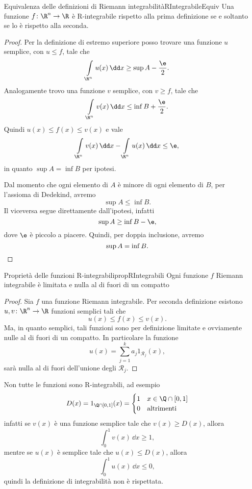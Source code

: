 \begin{teor}{Equivalenza delle definizioni di Riemann integrabilità}{RIntegrabileEquiv}
	Una funzione \(f\colon\R^n\to\R\) è R-integrabile rispetto alla prima definizione se e soltanto se lo è rispetto alla seconda.
\end{teor}

\begin{proof}
	\graffito{\(\Rightarrow)\)}Per la definizione di estremo superiore posso trovare una funzione \(u\) semplice, con \(u\le f\), tale che
	\[
		\int\limits_{\R^n}u(x)\,\dd x\ge\sup A- \frac{\e}{2}.
	\]
	Analogamente trovo una funzione \(v\) semplice, con \(v\ge f\), tale che
	\[
		\int\limits_{\R^n}v(x)\,\dd x\le \inf B+ \frac{\e}{2}.
	\]
	Quindi \(u(x)\le f(x) \le v(x)\) e vale
	\[
		\int\limits_{\R^n}v(x)\,\dd x- \int\limits_{\R^n} u(x)\,\dd x\le \e,
	\]
	in quanto \(\sup A=\inf B\) per ipotesi.

	\graffito{\(\Leftarrow)\)}Dal momento che ogni elemento di \(A\) è minore di ogni elemento di \(B\), per l'assioma di Dedekind, avremo
	\[
		\sup A\le \inf B.
	\]
	Il viceversa segue direttamente dall'ipotesi, infatti
	\[
		\sup A\ge \inf B-\e,
	\]
	dove \(\e\) è piccolo a piacere.
	Quindi, per doppia inclusione, avremo
	\[
		\sup A=\inf B.\qedhere
	\]
\end{proof}

\begin{prop}{Proprietà delle funzioni R-integrabili}{propRIntegrabili}
	Ogni funzione \(f\) Riemann integrabile è limitata e nulla al di fuori di un compatto
\end{prop}

\begin{proof}
	Sia \(f\) una funzione Riemann integrabile.
	Per seconda definizione esistono \(u,v\colon\R^n\to\R\) funzioni semplici tali che
	\[
		u(x)\le f(x)\le v(x).
	\]
	Ma, in quanto semplici, tali funzioni sono per definizione limitate e ovviamente nulle al di fuori di un compatto.
	In particolare la funzione
	\[
		u(x)=\sum_{j=1}^k a_j 1_{\mathcal{R}_j}(x),
	\]
	sarà nulla al di fuori dell'unione degli \(\mathcal{R}_j\).
\end{proof}

\begin{ese}
	Non tutte le funzioni sono R-integrabili, ad esempio
	\[
		D(x)=1_{\Q\cap[0,1]}(x)=
		\begin{cases}
			1 & x\in\Q\cap [0,1]  \\
			0 & \text{altrimenti}
		\end{cases}
	\]
	infatti se \(v(x)\) è una funzione semplice tale che \(v(x)\ge D(x)\), allora
	\[
		\int_0^1 v(x)\,\dd x \ge 1,
	\]
	mentre se \(u(x)\) è semplice tale che \(u(x)\le D(x)\), allora
	\[
		\int_0^1 u(x)\,\dd x\le 0,
	\]
	quindi la definizione di integrabilità non è rispettata.
\end{ese}

